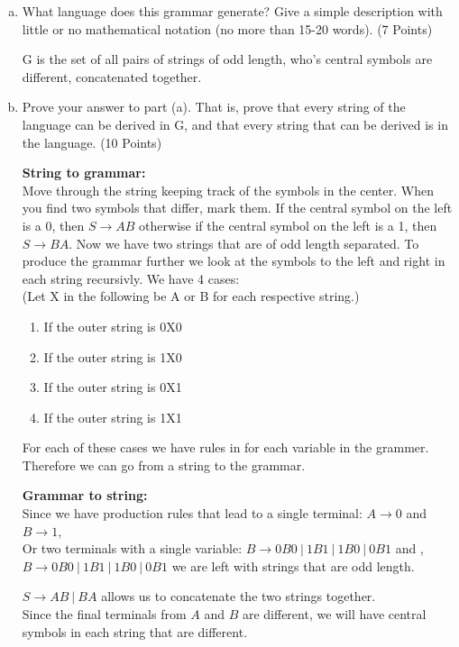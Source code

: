 \documentclass{article}
\begin{document}
\begin{enumerate}[(a)]
\item What language does this grammar generate? Give a simple description with little
or no mathematical notation (no more than 15-20 words). (7 Points)

G is the set of all pairs of strings of odd length, who's central symbols are different,
concatenated together.

\item Prove your answer to part (a). That is, prove that every string of the language
can be derived in G, and that every string that can be derived is in the language. (10 Points)

\textbf{String to grammar:}\\
Move through the string keeping track of the symbols in the center. When you find two symbols
that differ, mark them. If the central symbol on the left is a 0, then $S \rightarrow AB$
otherwise if the central symbol on the left is a 1, then $S \rightarrow BA$. Now we have two
strings that are of odd length separated. To produce the grammar further we look at the symbols
to the left and right in each string recursivly. We have 4 cases:\\
(Let X in the following be A or B for each respective string.)
\begin{enumerate}[1.]
\item If the outer string is 0X0
\item If the outer string is 1X0
\item If the outer string is 0X1
\item If the outer string is 1X1
\end{enumerate}

For each of these cases we have rules in for each variable in the grammer.\\
Therefore we can go from a string to the grammar.

\textbf{Grammar to string:}\\
Since we have production rules that lead to a single terminal: $A \rightarrow 0$ and
$B \rightarrow 1$, \\
Or two terminals with a single variable:
$B \rightarrow 0B0\ |\ 1B1\ |\ 1B0\ |\ 0B1$ and , $B \rightarrow 0B0\ |\ 1B1\ |\ 1B0\ |\ 0B1$
we are left with strings that are odd length.

$S \rightarrow AB\ |\ BA$ allows us to concatenate the two strings together.\\
Since the final terminals from $A$ and $B$ are different, we will have central symbols in each
string that are different.


\end{enumerate}
\end{document}
